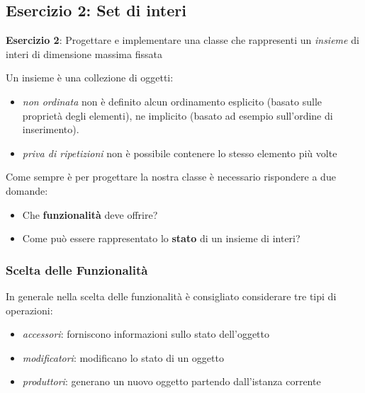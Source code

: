 \documentclass{article}
\begin{document}
\subsection{Esercizio 2: Set di interi}

\begin{framed}
\textbf{Esercizio 2}: Progettare e implementare una classe che rappresenti un \emph{insieme} di interi di dimensione massima fissata
\end{framed}
Un insieme \`e una collezione di oggetti:
\begin{itemize}
	\item \emph{non ordinata} non è definito alcun ordinamento esplicito (basato sulle proprietà degli elementi),
	ne implicito (basato ad esempio sull'ordine di inserimento).
	\item \emph{priva di ripetizioni} non è possibile contenere lo stesso elemento più volte
\end{itemize}

Come sempre \`e per progettare la nostra classe \`e necessario rispondere a due domande:
\begin{itemize}
		\item Che \textbf{funzionalità} deve offrire?
	\item Come può essere rappresentato lo \textbf{stato} di un insieme di interi?
\end{itemize}

\subsubsection{Scelta delle Funzionalit\`a}
In generale nella scelta delle funzionalit\`a \`e consigliato considerare tre tipi di operazioni:

\begin{itemize}
\item \emph{accessori}: forniscono informazioni sullo stato dell'oggetto
\item \emph{modificatori}: modificano lo stato di un oggetto
\item \emph{produttori}: generano un nuovo oggetto partendo dall'istanza corrente
\end{itemize}
\end{document}
